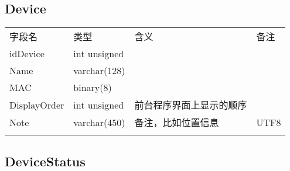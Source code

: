 \subsection{Device}\label{device}

\begin{longtabu}[c]{@{}lXXX@{}}
\toprule\addlinespace
字段名 & 类型 & 含义 & 备注
\\\addlinespace
\midrule\endhead
idDevice & int unsigned & &
\\\addlinespace
Name & varchar(128) & &
\\\addlinespace
MAC & binary(8) & &
\\\addlinespace
DisplayOrder & int unsigned & 前台程序界面上显示的顺序 &
\\\addlinespace
Note & varchar(450) & 备注，比如位置信息 & UTF8
\\\addlinespace
\bottomrule
\end{longtabu}

\subsection{DeviceStatus}\label{devicestatus}

